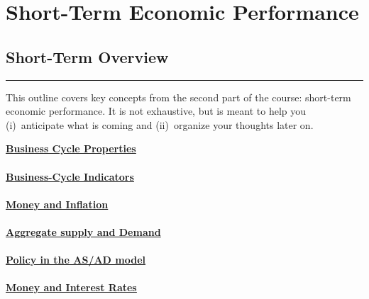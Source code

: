 \part{Short-Term Economic Performance}


\chapter*{Short-Term Overview}
\hypertarget{srp}{}

\rule{\textwidth}{1pt}

This outline covers key concepts from the second part of the course:
short-term economic performance.
It is not exhaustive, but is meant to help you
(i)~anticipate what is coming and
(ii)~organize your thoughts later on.


\medskip
\textbf{\hyperref[chp:bcpr]{\underline{Business Cycle Properties}}}\\ \\
     

\textbf{\hyperref[chp:bcin]{\underline{Business-Cycle Indicators}}}\\ \\
     

\hyperref[chp:mpin]{\textbf{\underline{Money and Inflation}}} \\ \\
     
    
\hyperref[chp:asad]{\textbf{\underline{Aggregate supply and Demand}}} \\ \\
     
      
\hyperref[chp:pasad]{\textbf{\underline{Policy in the AS/AD model}}}\\ \\
    
    
\hyperref[chp:mpir]{\textbf{\underline{Money and Interest Rates}}}\\ \\
     
    